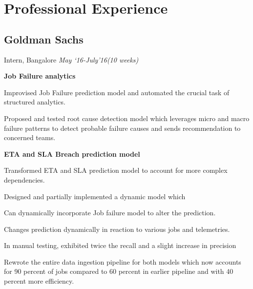 \documentclass[a4paper]{twentysecondcv} %
\begin{document}




\makeprofile %

\vspace{-2mm}
\section{Professional Experience}
\vspace{-2mm}

\subsection{\textbf{Goldman Sachs}}
\vspace{-2mm}
Intern, Bangalore \hfill \emph{May `16-July'16(10 weeks)}\\
\vspace{-4mm}\begin{list3}
\item \textbf{Job Failure analytics}
  \begin{list3}
  \item Improvised Job Failure prediction model and automated the
    crucial task of structured analytics.
  \item Proposed and tested root cause detection model which leverages
    micro and macro failure patterns to detect probable failure causes
    and sends recommendation to concerned teams.
  \end{list3}
  \item \textbf{ETA and SLA Breach prediction model}
  \begin{list3}
  \item Transformed ETA and SLA prediction model to account for more
    complex dependencies.
  \item Designed and partially implemented a dynamic model which
    \begin{list3}
    \item Can dynamically incorporate Job failure model to alter the
      prediction.
    \item Changes prediction dynamically in reaction to various
      jobs and telemetries.
    \item In manual testing, exhibited twice the recall and a slight
      increase in precision
    \end{list3}
  \end{list3}
\item Rewrote the entire data ingestion pipeline for both models which now
  accounts for 90 percent of jobs compared to 60 percent in earlier
  pipeline and with 40 percent more efficiency.
  \newline
  \newline
\end{list3}
\end{document}

